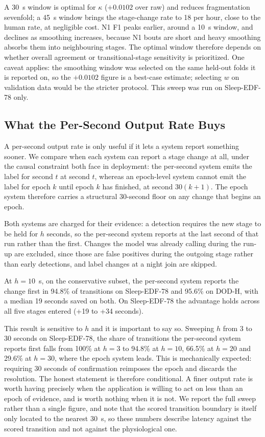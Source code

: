 \documentclass[conference]{IEEEtran}
\begin{document}
A 30~s window is optimal for $\kappa$ ($+0.0102$ over raw) and reduces fragmentation sevenfold; a
45~s window brings the stage-change rate to 18 per hour, close to the human rate, at negligible
cost. N1 F1 peaks earlier, around a 10~s window, and declines as smoothing increases, because N1
bouts are short and heavy smoothing absorbs them into neighbouring stages. The optimal window
therefore depends on whether overall agreement or transitional-stage sensitivity is prioritized. One
caveat applies: the smoothing window was selected on the same held-out folds it is reported on, so
the $+0.0102$ figure is a best-case estimate; selecting $w$ on validation data would be the stricter
protocol. This sweep was run on Sleep-EDF-78 only.

\subsection{What the Per-Second Output Rate Buys}
\label{sec:boundary}

A per-second output rate is only useful if it lets a system report something sooner. We compare when
each system can report a stage change at all, under the causal constraint both face in deployment:
the per-second system emits the label for second $t$ at second $t$, whereas an epoch-level system
cannot emit the label for epoch $k$ until epoch $k$ has finished, at second $30(k+1)$. The epoch
system therefore carries a structural 30-second floor on any change that begins an epoch.

Both systems are charged for their evidence: a detection requires the new stage to be held for $h$
seconds, so the per-second system reports at the last second of that run rather than the first.
Changes the model was already calling during the run-up are excluded, since those are false
positives during the outgoing stage rather than early detections, and label changes at a night join
are skipped.

At $h = 10$~s, on the conservative subset, the per-second system reports the change first in 94.8\%
of transitions on Sleep-EDF-78 and 95.6\% on DOD-H, with a median 19 seconds saved on both. On
Sleep-EDF-78 the advantage holds across all five stages entered (+19 to +34 seconds).

This result is sensitive to $h$ and it is important to say so. Sweeping $h$ from 3 to 30 seconds on
Sleep-EDF-78, the share of transitions the per-second system reports first falls from 100\% at
$h = 3$ to 94.8\% at $h = 10$, 66.5\% at $h = 20$ and 29.6\% at $h = 30$, where the epoch system
leads. This is mechanically expected: requiring 30 seconds of confirmation reimposes the epoch and
discards the resolution. The honest statement is therefore conditional. A finer output rate is worth
having precisely when the application is willing to act on less than an epoch of evidence, and is
worth nothing when it is not. We report the full sweep rather than a single figure, and note that
the scored transition boundary is itself only located to the nearest 30~s, so these numbers describe
latency against the scored transition and not against the physiological one.
\end{document}
